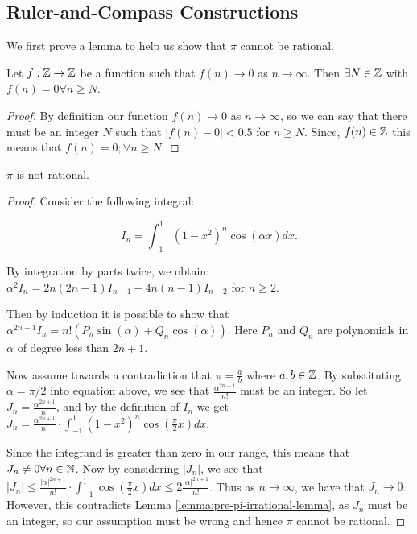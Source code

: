 \subsection{Ruler-and-Compass Constructions} \label{sec:construction}
We first prove a lemma to help us show that $\pi$ cannot be rational.

\begin{lemma}\label{lemma:pre-pi-irrational-lemma}
    Let $f:\mathbb Z \rightarrow \mathbb Z$ be a function such that $f(n)\rightarrow 0$ as $n \rightarrow \infty$. Then $\exists N \in \mathbb Z$ with $f(n)=0 \forall n\geq N$.
\end{lemma}

\begin{proof}
    By definition our function $f(n) \rightarrow 0$ as $n \rightarrow \infty$, so we can say that there must be an integer $N$ such that $|f(n)-0|<0.5$ for $n\geq N$. Since, $f(n) \in \mathbb Z$ this means that $f(n)=0; \forall n \geq N$.
\end{proof}

\begin{theorem}
    $\pi$ is not rational.
\end{theorem}

\begin{proof}

    Consider the following integral:

    $$I_n = \int_{-1}^{1} (1-x^2)^n \cos(\alpha x)dx. $$

    By integration by parts twice, we obtain:
    $\alpha^2I_n=2n(2n-1)I_{n-1}-4n(n-1)I_{n-2}$ for $n\geq 2$.

    Then by induction it is possible to show that $\alpha^{2n+1}I_n=n!(P_n \sin(\alpha)+Q_n \cos(\alpha))$.
    Here $P_n$ and $Q_n$ are polynomials in $\alpha$ of degree less than $2n+1$.

    Now assume towards a contradiction that $\pi = \frac{a}{b}$ where $a,b\in \mathbb Z$. By substituting $\alpha = \pi/2$ into equation above, we see that $\frac{\alpha^{2n+1}}{n!}$ must be an integer. So let $J_n = \frac{\alpha^{2n+1}}{n!}$, and by the definition of $I_n$ we get $J_n = \frac{\alpha^{2n+1}}{n!}\cdot \int_{-1}^{1} (1-x^2)^n \cos(\frac{\pi}{2} x)dx$.

    Since the integrand is greater than zero in our range, this means that $J_n \neq 0 \forall n \in \mathbb N$. Now by considering $|J_n|$, we see that $|J_n| \leq \frac{|\alpha|^{2n+1}}{n!} \cdot \int_{-1}^1 \cos(\frac{\pi}{2}x)dx \leq 2\frac{|\alpha|^{2n+1}}{n!}$. Thus as $n\rightarrow \infty$, we have that $J_n\rightarrow 0$. However, this contradicts Lemma \ref{lemma:pre-pi-irrational-lemma}, as $J_n$ must be an integer, so our assumption must be wrong and hence $\pi$ cannot be rational.
\end{proof}

